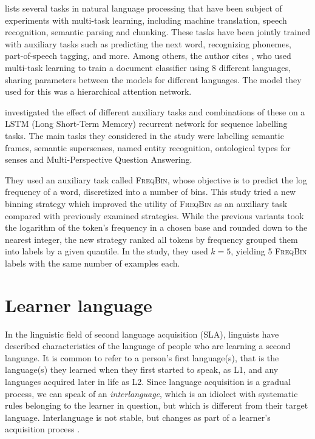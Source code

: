 \textcite{ruder17} lists several tasks in natural language processing that
have been subject of experiments with multi-task learning, including machine
translation, speech recognition, semantic parsing and chunking. These tasks
have been jointly trained with auxiliary tasks such as predicting the next
word, recognizing phonemes, part-of-speech tagging, and more. Among others,
the author cites \textcite{pappas17}, who used multi-task learning to train a
document classifier using 8 different languages, sharing parameters between
the models for different languages. The model they used for this was a
hierarchical attention network.

\textcite{alonso17} investigated the effect of different auxiliary tasks and
combinations of these on a LSTM (Long Short-Term Memory) recurrent network
for sequence labelling tasks. The main tasks they considered in the study
were labelling semantic frames, semantic supersenses, named entity
recognition, ontological types for senses and Multi-Perspective Question
Answering.

They used an auxiliary task called \textsc{FreqBin}, whose objective is to
predict the log frequency of a word, discretized into a number of bins. This
study tried a new binning strategy which improved the utility of
\textsc{FreqBin} as an auxiliary task compared with previously examined
strategies. While the previous variants took the logarithm of the token's
frequency in a chosen base and rounded down to the nearest integer, the new
strategy ranked all tokens by frequency grouped them into labels by a given
quantile. In the study, they used $k=5$, yielding 5 \textsc{FreqBin} labels
with the same number of examples each.


\section{Learner language}

In the linguistic field of second language acquisition (SLA), linguists have
described characteristics of the language of people who are learning a second
language. It is common to refer to a person's first language(s), that is the
language(s) they learned when they first started to speak, as L1, and any
languages acquired later in life as L2. Since language acquisition is a
gradual process, we can speak of an \emph{interlanguage}, which is an
idiolect with systematic rules belonging to the learner in question, but
which is different from their target language. Interlanguage is not stable,
but changes as part of a learner's acquisition process
\autocite[358]{myers-scotton}.

